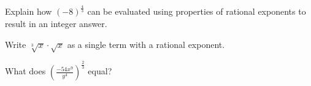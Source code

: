 \item %
Explain how $(-8)^\frac{4}{3}$ can be evaluated using properties of rational exponents to result in an integer answer.

\item %
Write $\sqrt[3]{x} \cdot \sqrt{x}$ as a single term with a rational exponent.

\item %
What does $\displaystyle \left( \frac{-54x^9}{y^4}\right)^{\frac{2}{3}}$ equal?


